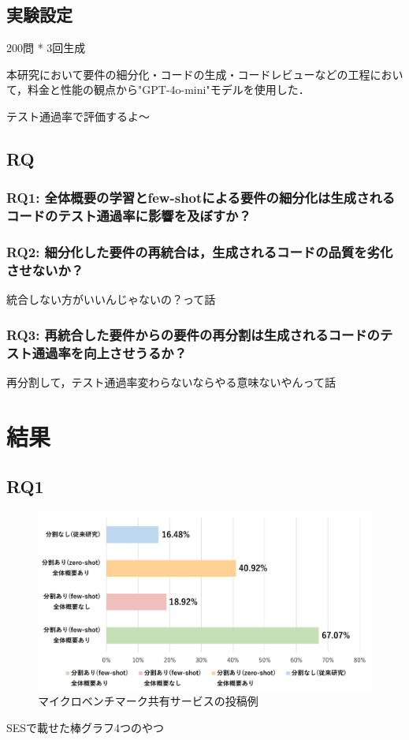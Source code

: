 \documentclass[submit,techrep,noauthor]{ipsj}
\begin{document}
\subsection{実験設定}
200問 * 3回生成

本研究において要件の細分化・コードの生成・コードレビューなどの工程において，料金と性能の観点から"GPT-4o-mini"モデルを使用した．

テスト通過率で評価するよ〜

\subsection{RQ}
\subsubsection{RQ1: 全体概要の学習とfew-shotによる要件の細分化は生成されるコードのテスト通過率に影響を及ぼすか？}
\subsubsection{RQ2: 細分化した要件の再統合は，生成されるコードの品質を劣化させないか？}
統合しない方がいいんじゃないの？って話
\subsubsection{RQ3: 再統合した要件からの要件の再分割は生成されるコードのテスト通過率を向上させうるか？}
再分割して，テスト通過率変わらないならやる意味ないやんって話

\section{結果}

\subsection{RQ1}
\begin{figure}[t]
    \centering
    \includegraphics[width=1.0\linewidth]{./Toyoshima_fig/SIGSE_fig1.pdf}
    \caption{マイクロベンチマーク共有サービスの投稿例\protect\footnotemark}
    \label{fig:jsPerf}
\end{figure}
SESで載せた棒グラフ4つのやつ
\end{document}
